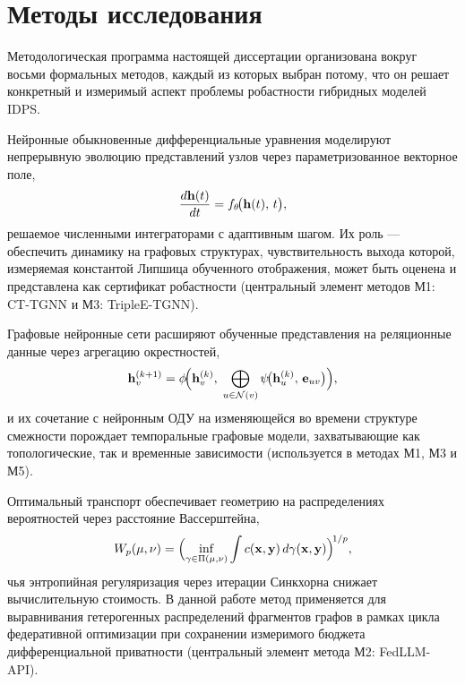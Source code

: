 \section*{Методы исследования}

Методологическая программа настоящей диссертации организована вокруг восьми формальных методов, каждый из которых выбран потому, что он решает конкретный и измеримый аспект проблемы робастности гибридных моделей IDPS.

Нейронные обыкновенные дифференциальные уравнения моделируют непрерывную эволюцию представлений узлов через параметризованное векторное поле,
\begin{equation}
\frac{d\mathbf{h}(t)}{dt} = f_\theta\!\bigl(\mathbf{h}(t),\, t\bigr),
\label{eq:node}
\end{equation}
решаемое численными интеграторами с адаптивным шагом. Их роль --- обеспечить динамику на графовых структурах, чувствительность выхода которой, измеряемая константой Липшица обученного отображения, может быть оценена и представлена как сертификат робастности (центральный элемент методов М1: CT-TGNN и М3: TripleE-TGNN).

Графовые нейронные сети расширяют обученные представления на реляционные данные через агрегацию окрестностей,
\begin{equation}
\mathbf{h}_v^{(k+1)}
= \phi\!\Bigl(\mathbf{h}_v^{(k)},\;
  \bigoplus_{u\in\mathcal{N}(v)}
    \psi\!\bigl(\mathbf{h}_u^{(k)},\, \mathbf{e}_{uv}\bigr)\Bigr),
\label{eq:gnn_mp}
\end{equation}
и их сочетание с нейронным ОДУ на изменяющейся во времени структуре смежности порождает темпоральные графовые модели, захватывающие как топологические, так и временные зависимости (используется в методах М1, М3 и М5).

Оптимальный транспорт обеспечивает геометрию на распределениях вероятностей через расстояние Вассерштейна,
\begin{equation}
W_p(\mu,\nu)
= \Bigl(\inf_{\gamma\in\Pi(\mu,\nu)}
    \int c(\mathbf{x},\mathbf{y})\,d\gamma(\mathbf{x},\mathbf{y})
  \Bigr)^{\!1/p},
\label{eq:wasserstein}
\end{equation}
чья энтропийная регуляризация через итерации Синкхорна снижает вычислительную стоимость. В данной работе метод применяется для выравнивания гетерогенных распределений фрагментов графов в рамках цикла федеративной оптимизации при сохранении измеримого бюджета дифференциальной приватности (центральный элемент метода М2: FedLLM-API).

